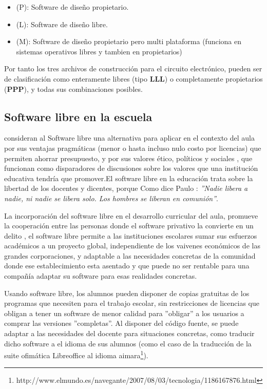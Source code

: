 \begin{itemize}
   \item (P): Software de diseño propietario.
   \item (L): Software de diseño libre.
   \item (M): Software de diseño propietario pero multi plataforma (funciona en sistemas operativos libres y tambien en propietarios)
 \end{itemize} 

Por tanto los tres archivos de construcción para el circuito electrónico, pueden ser de clasificación como enteramente libres (tipo \textbf{LLL}) o completamente propietarios (\textbf{PPP}), y todas sus combinaciones posibles.


\subsection{Software libre en la escuela}

\citet{adell_software_2007} consideran al Software libre una alternativa para aplicar en el contexto del aula por sus ventajas pragmáticas (menor o hasta incluso nulo costo por licencias) que permiten ahorrar presupuesto, y por sus valores ético, políticos y sociales \citep{hart_open_2003}, que funcionan como disparadores de discusiones sobre los valores que una institución educativa tendría que promover.El software libre en la educación trata sobre la libertad de los docentes y dicentes, porque Como dice Paulo \citet{freire_pedagogioprimido._2015}: \textit{''Nadie libera a nadie, ni nadie se libera solo. Los hombres se liberan en comunión''}.

La incorporación del software libre en el desarrollo curricular del aula, promueve la cooperación entre las personas donde el software privativo la convierte en un delito \cite{adell_software_2007}, el software libre permite a las instituciones escolares sumar sus esfuerzos académicos a un proyecto global, independiente de los vaivenes económicos de las grandes corporaciones, y adaptable a las necesidades concretas de la comunidad donde ese establecimiento esta asentado y que puede no ser rentable para una compañía adaptar su software para esas realidades concretas.

Usando software libre, los alumnos pueden disponer de copias gratuitas de los programas que necesiten para el trabajo escolar, sin restricciones de licencias que obligan a tener un software de menor calidad para ''obligar'' a los usuarios a comprar las versiones ''completas''. Al disponer del código fuente, se puede adaptar a las necesidades del docente para situaciones concretas, como traducir dicho software a el idioma de sus alumnos (como el caso de la traducción de la suite ofimática Libreoffice al idioma aimara\footnote{http://www.elmundo.es/navegante/2007/08/03/tecnologia/1186167876.html}). 

